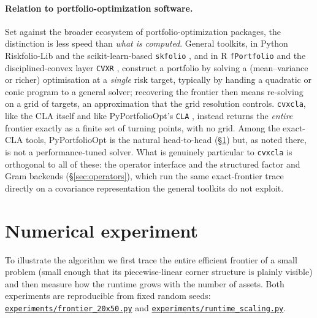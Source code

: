 \documentclass[11pt]{article}
\newcommand{\repourl}{https://github.com/cvxgrp/cvxcla}
\newcommand{\srcref}{v1.8.1}
\newcommand{\srcfile}[2]{\href{\repourl/blob/\srcref/#1}{\texttt{#2}}}
\begin{document}
\paragraph{Relation to portfolio-optimization software.}
Set against the broader ecosystem of portfolio-optimization packages, the
distinction is less speed than \emph{what is computed}. General toolkits, in Python
Riskfolio-Lib \citep{riskfolio} and the scikit-learn-based \texttt{skfolio}
\citep{skfolio}, and in R \texttt{fPortfolio} \citep{fportfolio} and the
disciplined-convex layer \texttt{CVXR} \citep{cvxr}, construct a portfolio by
solving a (mean--variance or richer) optimisation at a \emph{single} risk target,
typically by handing a quadratic or conic program to a general solver; recovering
the frontier then means re-solving on a grid of targets, an approximation that the
grid resolution controls. \texttt{cvxcla}, like the CLA itself and like
PyPortfolioOpt's \texttt{CLA} \citep{pyportfolioopt}, instead returns the
\emph{entire} frontier exactly as a finite set of turning points, with no grid.
Among the exact-CLA tools, PyPortfolioOpt is the natural head-to-head
(\S\ref{sec:experiment}) but, as noted there, is not a performance-tuned solver. What is genuinely particular to \texttt{cvxcla} is
orthogonal to all of these: the operator interface and the structured factor and
Gram backends (\S\ref{sec:operators}), which run the same exact-frontier trace
directly on a covariance representation the general toolkits do not exploit.

\section{Numerical experiment}
\label{sec:experiment}

To illustrate the algorithm we first trace the entire efficient frontier of a
small problem (small enough that its piecewise-linear corner structure is
plainly visible) and then measure how the runtime grows with the number of
assets. Both experiments are reproducible from fixed random seeds:
\srcfile{experiments/frontier_20x50.py}{experiments/frontier\_20x50.py} and
\srcfile{experiments/runtime_scaling.py}{experiments/runtime\_scaling.py}.
\end{document}
